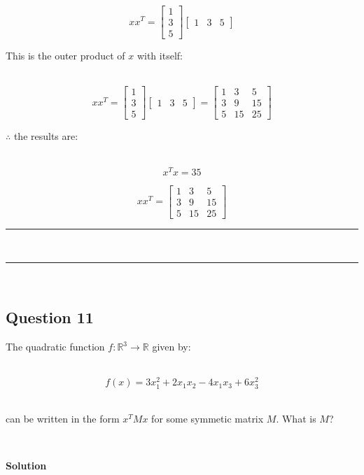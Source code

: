 \documentclass{article}
\begin{document}
$$xx^T = \begin{bmatrix} 1 \\ 3 \\ 5 \end{bmatrix} \begin{bmatrix} 1 & 3 & 5 \end{bmatrix}$$

\parbox{\textwidth}{This is the outer product of $x$ with itself:}\\

$$xx^T = \begin{bmatrix} 1 \\ 3 \\ 5 \end{bmatrix} \begin{bmatrix} 1 & 3 & 5 \end{bmatrix} = \begin{bmatrix} 1 & 3 & 5 \\ 3 & 9 & 15 \\ 5 & 15 & 25 \end{bmatrix}$$

\parbox{\textwidth}{$\therefore$ the results are:}\\

$$x^Tx = 35$$

$$xx^T = \begin{bmatrix} 1 & 3 & 5 \\ 3 & 9 & 15 \\ 5 & 15 & 25 \end{bmatrix}$$

\noindent\rule{\textwidth}{0.4pt}\\
\noindent\rule{\textwidth}{0.4pt}\\

\newpage

\subsection*{Question 11}

\parbox{\textwidth}{The quadratic function $f : \mathbb{R}^3 \rightarrow \mathbb{R}$ given by:}\\

$$f(x) = 3x^2_1 +2x_1x_2 -4x_1x_3 +6x^2_3$$\\

\parbox{\textwidth}{can be written in the form $x^TMx$ for some symmetic matrix $M$. What is $M$?}\\

\parbox{\textwidth}{\textbf{Solution}}
\end{document}
